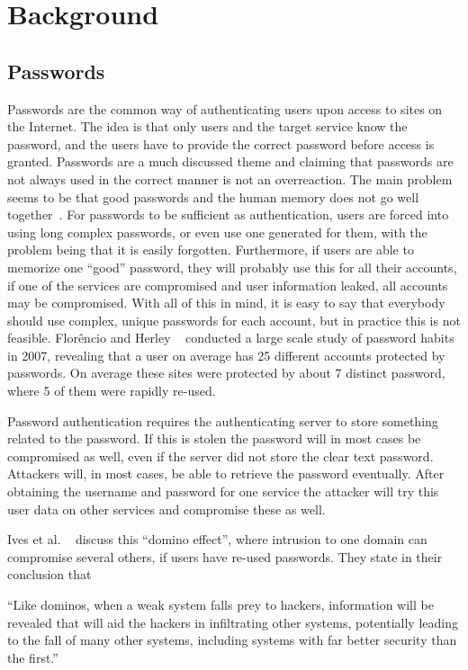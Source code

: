 \chapter{Background}\label{chp:background}


\section{Passwords}
Passwords are the common way of authenticating users upon access to sites on the Internet. The idea is that only users and the target service know the password, and the users have to provide the correct password before access is granted. Passwords are a much discussed theme and claiming that passwords are not always used in the correct manner is not an overreaction. The main problem seems to be that good passwords and the human memory does not go well together~\cite{memorability_yan}. For passwords to be sufficient as authentication, users are forced into using long complex passwords, or even use one generated for them, with the problem being that it is easily forgotten. Furthermore, if users are able to memorize one ``good'' password, they will probably use this for all their accounts, if one of the services are compromised and user information leaked, all accounts may be compromised. With all of this in mind, it is easy to say that everybody should use complex, unique passwords for each account, but in practice this is not feasible. Florêncio and Herley ~\cite{password-habits} conducted a large scale study of password habits in 2007, revealing that a user on average has 25 different accounts protected by passwords. On average these sites were protected by about 7 distinct password, where 5 of them were rapidly re-used.
\par Password authentication requires the authenticating server to store something related to the password. If this is stolen the password will in most cases be compromised as well, even if the server did not store the clear text password. Attackers will, in most cases, be able to retrieve the password eventually. After obtaining the username and password for one service the attacker will try this user data on other services and compromise these as well. 
\par Ives et al. ~\cite{domino-effect} discuss this ``domino effect'', where intrusion to one domain can compromise several others, if users have re-used passwords. They state in their conclusion that
\begin{displayquote}
``Like dominos, when a weak system falls prey to hackers, information will be revealed that will aid the hackers in infiltrating other systems, potentially leading to the fall of many other systems, including systems with far better security than the first.''
\end{displayquote}

